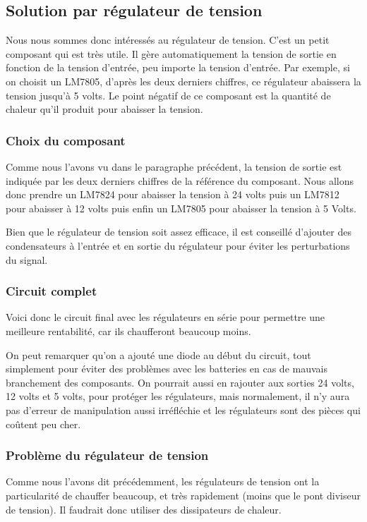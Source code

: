 \documentclass{PackagerQualityN}
\begin{document}
\newpage
\subsection{Solution par régulateur de tension}
Nous nous sommes donc intéressés au régulateur de tension. C'est un petit composant qui est très utile. Il gère automatiquement la tension de sortie en fonction de la tension d'entrée, peu importe la tension d'entrée.
Par exemple, si on choisit un LM7805, d'après les deux derniers chiffres, ce régulateur abaissera la tension jusqu'à 5 volts. Le point négatif de ce composant est la quantité de chaleur qu'il produit pour abaisser la tension.
\subsubsection{Choix du composant}
Comme nous l'avons vu dans le paragraphe précédent, la tension de sortie est indiquée par les deux derniers chiffres de la référence du composant. Nous allons donc prendre un LM7824 pour abaisser la tension à 24 volts puis un LM7812 pour abaisser à 12 volts puis enfin un LM7805 pour abaisser la tension à 5 Volts.

Bien que le régulateur de tension soit assez efficace, il est conseillé d'ajouter des condensateurs à l'entrée et en sortie du régulateur pour éviter les perturbations du signal.

\subsubsection{Circuit complet}
Voici donc le circuit final avec les régulateurs en série pour permettre une meilleure rentabilité, car ils chaufferont beaucoup moins.

On peut remarquer qu'on a ajouté une diode au début du circuit, tout simplement pour éviter des problèmes avec les batteries en cas de mauvais branchement des composants. On pourrait aussi en rajouter aux sorties 24 volts, 12 volts et 5 volts, pour protéger les régulateurs, mais normalement, il n'y aura pas d'erreur de manipulation aussi irréfléchie et les régulateurs sont des pièces qui coûtent peu cher.

\newp
\subsubsection{Problème du régulateur de tension}
Comme nous l'avons dit précédemment, les régulateurs de tension ont la particularité de chauffer beaucoup, et très rapidement (moins que le pont diviseur de tension). Il faudrait donc utiliser des dissipateurs de chaleur.
\end{document}
